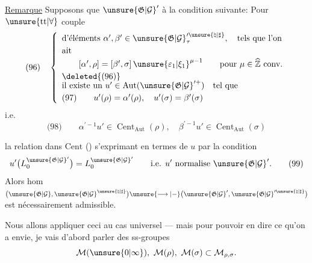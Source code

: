 \uline{Remarque} Supposons que $\unsure{\mathfrak{G}|\mathcal{G}}'$   à la condition suivante: Pour $\unsure{\mathrm{tt}|\forall}$ couple
\[
\text{(96)}\quad
\left\{\begin{array}{l}
\text{d'éléments }\alpha',\beta'\in \unsure{\mathfrak{G}|\mathcal{G}}_\tau^{\prime \unsure{\natural|\sharp}},\quad\text{tels que l'on}\\[.6ex]
\text{ait}\\[.6ex]
\qquad[\alpha',\rho]=[\beta',\sigma]\,\unsure{\varepsilon_1|\xi_1}^{\mu-1}
\qquad\text{pour }\mu\in\widehat{\mathbb Z}\ \text{conv.}\\[.6ex]
\deleted{\text{(96)}}\\[-.5ex]
\text{il existe un }u'\in\operatorname{Aut}(\unsure{\mathfrak{G}|\mathcal{G}}^{\prime+})\quad\text{tel que}\\[.6ex]
\text{(97)}\qquad u'(\rho)=\alpha'(\rho),\quad u'(\sigma)=\beta'(\sigma)
\end{array}\right.
\]
i.e.
\[
\text{(98)}\qquad
\alpha^{\prime-1}u'\in\operatorname{Cent}_{\operatorname{Aut}}(\rho),\quad
\beta^{\prime-1}u'\in\operatorname{Cent}_{\operatorname{Aut}}(\sigma)
\]



la relation dans $\mathrm{Cent}$ () s'exprimant en termes de $u$ par la condition
\[
u'\bigl(L_0^{\unsure{\mathfrak{G}|\mathcal{G}}'}\bigr)
=L_0^{\unsure{\mathfrak{G}|\mathcal{G}}'}
\qquad\text{i.e. }u'\text{ normalise }\unsure{\mathfrak{G}|\mathcal{G}}'.
\tag{99}
\]
Alors  \inserted{$(\rho,\sigma)$-}hom
$\bigl(\unsure{\mathfrak{G}|\mathcal{G}},\unsure{\mathfrak{G}|\mathcal{G}}^{\unsure{\natural|\sharp}}\bigr)
\unsure{\longrightarrow|-}
\bigl(\unsure{\mathfrak{G}|\mathcal{G}}',\unsure{\mathfrak{G}|\mathcal{G}}^{\prime\unsure{\natural|\sharp}}\bigr)$
est nécessairement admissible.

Nous allons appliquer ceci au cas  universel --- mais pour pouvoir en dire  ce qu'on a envie, je vais d'abord parler des ss-groupes
\[
\mathcal{M}(\unsure{0|\infty}),\ \mathcal{M}(\rho),\ \mathcal{M}(\sigma)\subset\mathcal{M}_{\rho,\sigma}.
\]





